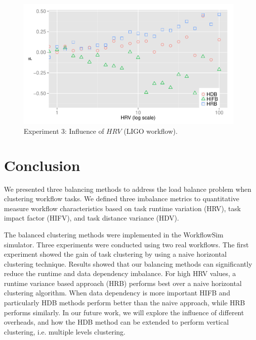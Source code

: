 \documentclass[final]{IEEEtran}
\begin{document}
\begin{figure}[htb]
\centering
	\includegraphics[width=\linewidth]{figure/exp3.pdf}
	\caption{Experiment 3: Influence of $HRV$ (LIGO workflow).}
	\label{fig:incluence_of_hrv}
	\vspace{-10pt}
\end{figure}


\section{Conclusion}

We presented three balancing methods to address the load balance problem when clustering workflow tasks. We defined three imbalance metrics to quantitative measure workflow characteristics based on task runtime variation (HRV), task impact factor (HIFV), and task distance variance (HDV).

The balanced clustering methods were implemented in the WorkflowSim simulator. Three experiments were conducted using two real workflows. The first experiment showed the gain of task clustering by using a naive horizontal clustering technique. Results showed that our balancing methods can significantly reduce the runtime and data dependency imbalance. For high HRV values, a runtime variance based approach (HRB) performs best over a naive horizontal clustering algorithm. When data dependency is more important HIFB and particularly HDB methods perform better than the naive approach, while HRB performs similarly.
In our future work, we will explore the influence of different overheads, and how the HDB method can be extended to perform vertical clustering, i.e. multiple levels clustering.




\end{document}

